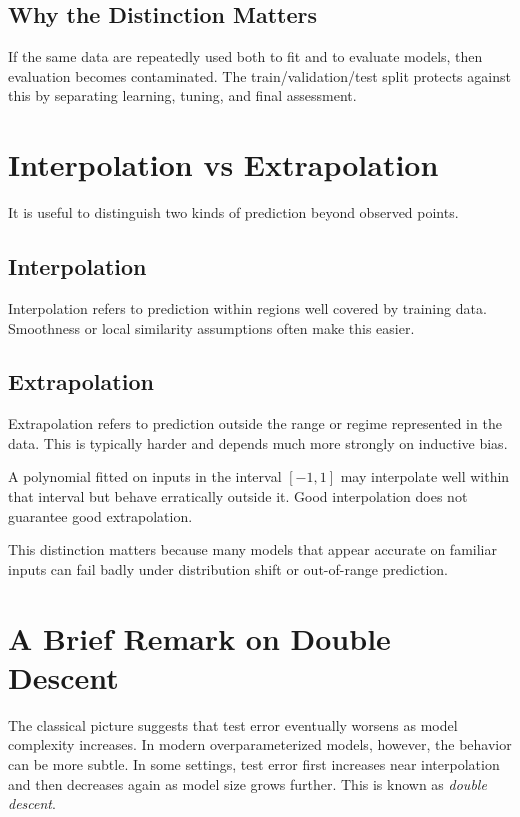 \subsection{Why the Distinction Matters}

If the same data are repeatedly used both to fit and to evaluate models, then evaluation becomes contaminated. The train/validation/test split protects against this by separating learning, tuning, and final assessment.

\section{Interpolation vs Extrapolation}

It is useful to distinguish two kinds of prediction beyond observed points.

\subsection{Interpolation}

Interpolation refers to prediction within regions well covered by training data. Smoothness or local similarity assumptions often make this easier.

\subsection{Extrapolation}

Extrapolation refers to prediction outside the range or regime represented in the data. This is typically harder and depends much more strongly on inductive bias.

\begin{example}
A polynomial fitted on inputs in the interval $[-1,1]$ may interpolate well within that interval but behave erratically outside it. Good interpolation does not guarantee good extrapolation.
\end{example}

This distinction matters because many models that appear accurate on familiar inputs can fail badly under distribution shift or out-of-range prediction.

\section{A Brief Remark on Double Descent}

The classical picture suggests that test error eventually worsens as model complexity increases. In modern overparameterized models, however, the behavior can be more subtle. In some settings, test error first increases near interpolation and then decreases again as model size grows further. This is known as \emph{double descent}.


